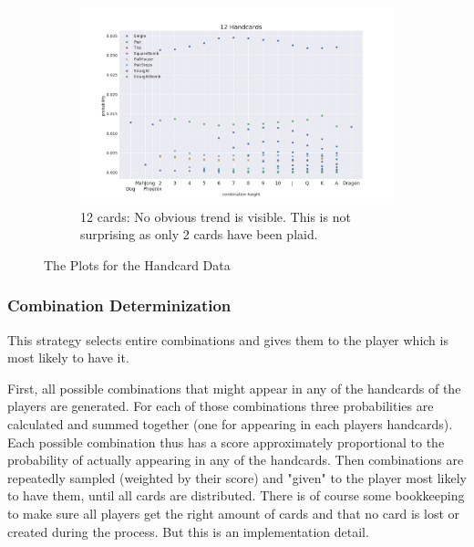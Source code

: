 \begin{figure}[ht]
\begin{center}
\begin{subfigure}[h]{.8\textwidth}
            \label{fig:hc5}
        \end{subfigure}
        \begin{subfigure}[h]{.8\textwidth}\includegraphics[width=\textwidth]{images/det/type_for_len_12}
            \caption{12 cards: No obvious trend is visible. This is not surprising as only 2 cards have been plaid.}
            \label{fig:hc12}
        \end{subfigure}
    \end{center}
\caption[Determinization Handcards Plot]{The Plots for the Handcard Data}
\label{fig:hc}

\end{figure}

\subsubsection{Combination Determinization}
This strategy selects entire combinations and gives them to the player which is most likely to have it.

First, all possible combinations that might appear in any of the handcards of the players are generated. For each of those combinations three probabilities are calculated and summed together (one for appearing in each players handcards). Each possible combination thus has a score approximately proportional to the probability of actually appearing in any of the handcards. Then combinations are repeatedly sampled (weighted by their score) and "given" to the player most likely to have them, until all cards are distributed.
There is of course some bookkeeping to make sure all players get the right amount of cards and that no card is lost or created during the process. But this is an implementation detail.

